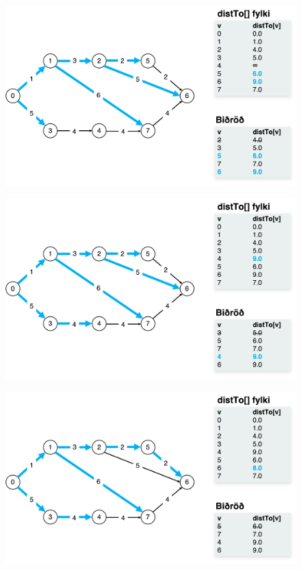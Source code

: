 \documentclass[12pt, a4paper, hidelinks]{article}
\begin{document}
\begin{figure}[H]
    \centering
    \includegraphics[width=\textwidth]{HD11/pdf/img/dijkstra/im4.png}
    \label{fig:dijkstra4}
\end{figure}

\begin{figure}[H]
    \centering
    \includegraphics[width=\textwidth]{HD11/pdf/img/dijkstra/im5.png}
    \label{fig:dijkstra5}
\end{figure}

\begin{figure}[H]
    \centering
    \includegraphics[width=\textwidth]{HD11/pdf/img/dijkstra/im6.png}
    \label{fig:dijkstra6}
\end{figure}
\end{document}
